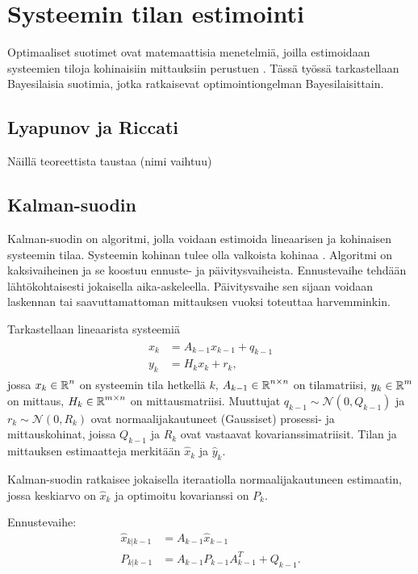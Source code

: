 \chapter{Systeemin tilan estimointi }%
\label{ch:estimointi}
Optimaaliset suotimet ovat  matemaattisia menetelmiä, joilla estimoidaan systeemien tiloja kohinaisiin mittauksiin perustuen \cite{sarkka_bayesian}. Tässä työssä tarkastellaan Bayesilaisia suotimia, jotka ratkaisevat optimointiongelman Bayesilaisittain. 

\section{Lyapunov ja Riccati}
{\color{red} Näillä teoreettista taustaa (nimi vaihtuu)}

\section{Kalman-suodin}

Kalman-suodin on algoritmi, jolla voidaan estimoida lineaarisen ja kohinaisen systeemin tilaa. Systeemin kohinan tulee olla valkoista kohinaa \cite[s. 56]{sarkka_bayesian}. Algoritmi on kaksivaiheinen ja se koostuu ennuste- ja päivitysvaiheista. 
Ennustevaihe tehdään lähtökohtaisesti jokaisella aika-askeleella. Päivitysvaihe sen sijaan voidaan laskennan tai saavuttamattoman mittauksen vuoksi toteuttaa harvemminkin. 

Tarkastellaan lineaarista systeemiä
\begin{align}
    \begin{split}
        x_k &= A_{k-1}x_{k-1} + q_{k-1} \\
        y_k &= H_k x_k + r_k,
    \end{split}
\end{align}
jossa \(x_k \in \operatorname{\mathbb{R}}^n \) on systeemin tila hetkellä \(k\), \(A_{k-1}\in \operatorname{\mathbb{R}}^{n\times n}\) on tilamatriisi, \(y_k\in \operatorname{\mathbb{R}}^m\) on mittaus, \(H_k \in \operatorname{\mathbb{R}}^{m \times n}\) on mittausmatriisi. Muuttujat \(q_{k-1} \sim \mathcal{N}(0, Q_{k-1})\) ja \(r_k \sim \mathcal{N}(0, R_k)\) ovat normaalijakautuneet (Gaussiset) prosessi- ja mittauskohinat, joissa \(Q_{k-1}\) ja \(R_k\) ovat vastaavat kovarianssimatriisit. Tilan ja mittauksen estimaatteja merkitään \(\hat{x}_k\) ja \(\hat{y}_k\).

Kalman-suodin ratkaisee jokaisella iteraatiolla normaalijakautuneen estimaatin, jossa keskiarvo on \(\hat{x}_k\) ja optimoitu kovarianssi on \(P_k\).  

Ennustevaihe:
\begin{align}
    \hat{x}_{k | k-1}  &= A_{k-1} \hat{x}_{k-1}\\
    P_{k | k-1} &= A_{k-1} P_{k-1} A_{k-1}^T + Q_{k-1}.
\end{align}


